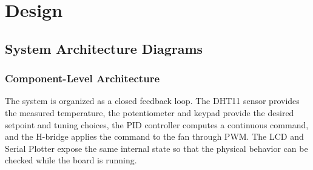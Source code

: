 \section{Design}

\subsection{System Architecture Diagrams}

\subsubsection{Component-Level Architecture}

The system is organized as a closed feedback loop. The DHT11 sensor provides the measured temperature, the potentiometer and keypad provide the desired setpoint and tuning choices, the PID controller computes a continuous command, and the H-bridge applies the command to the fan through PWM. The LCD and Serial Plotter expose the same internal state so that the physical behavior can be checked while the board is running.

